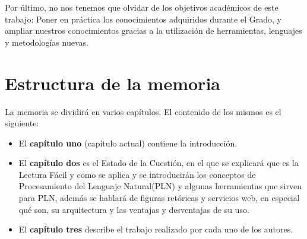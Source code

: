 Por último, no nos tenemos que olvidar de los objetivos académicos de este trabajo: Poner en práctica los conocimientos adquiridos durante el Grado, y ampliar nuestros conocimientos gracias a la utilización de herramientas, lenguajes y metodologías nuevas.
	
	
\section{Estructura de la memoria}
\label{cap:sec:estructuramemoria}

La memoria se dividirá en varios capítulos. El contenido de los mismos es el siguiente:
\begin{itemize}
	\item El \textbf{capítulo uno} (capítulo actual) contiene la introducción.
	\item El \textbf{capítulo dos} es el Estado de la Cuestión, en el que se explicará que es la Lectura Fácil y como se aplica y se introducirán los conceptos de Procesamiento del Lenguaje Natural(PLN) y algunas herramientas que sirven para PLN, además se hablará de figuras retóricas y servicios web, en especial qué son, su arquitectura y las ventajas y desventajas de su uso.
	\item El \textbf{capítulo tres} describe el trabajo realizado por cada uno de los autores.
\end{itemize}